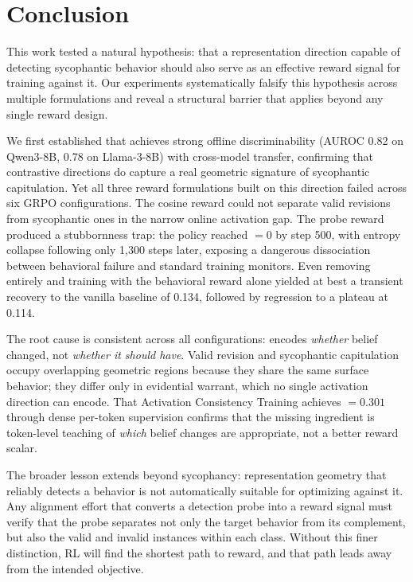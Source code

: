 \section{Conclusion}\label{sec:conclusion}

This work tested a natural hypothesis: that a representation direction capable of detecting sycophantic behavior should also serve as an effective reward signal for training against it. Our experiments systematically falsify this hypothesis across multiple formulations and reveal a structural barrier that applies beyond any single reward design.

We first established that \dsyc{} achieves strong offline discriminability (AUROC 0.82 on Qwen3-8B, 0.78 on Llama-3-8B) with cross-model transfer, confirming that contrastive directions do capture a real geometric signature of sycophantic capitulation. Yet all three reward formulations built on this direction failed across six GRPO configurations. The cosine reward could not separate valid revisions from sycophantic ones in the narrow online activation gap. The probe reward produced a stubbornness trap: the policy reached \tof{}$= 0$ by step 500, with entropy collapse following only 1{,}300 steps later, exposing a dangerous dissociation between behavioral failure and standard training monitors. Even removing \dsyc{} entirely and training with the behavioral \rthree{} reward alone yielded at best a transient recovery to the vanilla baseline of 0.134, followed by regression to a \sycon{} plateau at 0.114.

The root cause is consistent across all configurations: \dsyc{} encodes \emph{whether} belief changed, not \emph{whether it should have}. Valid revision and sycophantic capitulation occupy overlapping geometric regions because they share the same surface behavior; they differ only in evidential warrant, which no single activation direction can encode. That Activation Consistency Training achieves \sycon{}$= 0.301$ through dense per-token supervision confirms that the missing ingredient is token-level teaching of \emph{which} belief changes are appropriate, not a better reward scalar.

The broader lesson extends beyond sycophancy: representation geometry that reliably detects a behavior is not automatically suitable for optimizing against it. Any alignment effort that converts a detection probe into a reward signal must verify that the probe separates not only the target behavior from its complement, but also the valid and invalid instances within each class. Without this finer distinction, RL will find the shortest path to reward, and that path leads away from the intended objective.